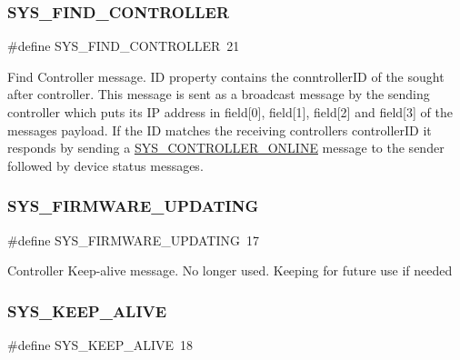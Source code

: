 \subsubsection{\texorpdfstring{S\+Y\+S\+\_\+\+F\+I\+N\+D\+\_\+\+C\+O\+N\+T\+R\+O\+L\+L\+ER}{SYS\_FIND\_CONTROLLER}}
{\footnotesize\ttfamily \#define S\+Y\+S\+\_\+\+F\+I\+N\+D\+\_\+\+C\+O\+N\+T\+R\+O\+L\+L\+ER~21}

Find Controller message. ID property contains the conntroller\+ID of the sought after controller. This message is sent as a broadcast message by the sending controller which puts its IP address in field\mbox{[}0\mbox{]}, field\mbox{[}1\mbox{]}, field\mbox{[}2\mbox{]} and field\mbox{[}3\mbox{]} of the message\textquotesingle{}s payload. If the ID matches the receiving controller\textquotesingle{}s controller\+ID it responds by sending a \hyperlink{group___u_d_p_message_i_d_ga23aab89076591390a1dbc412a3a07314}{S\+Y\+S\+\_\+\+C\+O\+N\+T\+R\+O\+L\+L\+E\+R\+\_\+\+O\+N\+L\+I\+NE} message to the sender followed by device status messages. \mbox{\label{group___u_d_p_message_i_d_ga122f4ab16a4cf3e2dd8b80e02158963d}} 
\subsubsection{\texorpdfstring{S\+Y\+S\+\_\+\+F\+I\+R\+M\+W\+A\+R\+E\+\_\+\+U\+P\+D\+A\+T\+I\+NG}{SYS\_FIRMWARE\_UPDATING}}
{\footnotesize\ttfamily \#define S\+Y\+S\+\_\+\+F\+I\+R\+M\+W\+A\+R\+E\+\_\+\+U\+P\+D\+A\+T\+I\+NG~17}

Controller Keep-\/alive message. No longer used. Keeping for future use if needed \mbox{\label{group___u_d_p_message_i_d_ga596f44c285ab391c72addd0e803b0fc4}} 
\subsubsection{\texorpdfstring{S\+Y\+S\+\_\+\+K\+E\+E\+P\+\_\+\+A\+L\+I\+VE}{SYS\_KEEP\_ALIVE}}
{\footnotesize\ttfamily \#define S\+Y\+S\+\_\+\+K\+E\+E\+P\+\_\+\+A\+L\+I\+VE~18}

